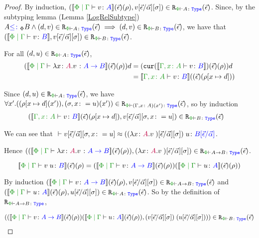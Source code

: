 \begin{framed}
\begin{proof}
            By induction, $\inLogRelPE{\deno{\gpetyperelation{v}{A}}\fundRho}{v\fundSub}{A}$.
            Since, by the subtyping lemma (Lemma \ref{LogRelSubtype}) $A\subtypep B \wedge \inLogRelPE{d}{v}{A} \implies \inLogRelPE{d}{v}{B}$, we have that $\inLogRelPE{\deno{\gpetyperelation{v}{B}}}{v\fundSub}{B}$.
        
            \case{\vfun}
        
            For all $\inLogRelPE{d}{u}{A}$, 
            \begin{align*}
                (\deno{\gpetyperelation{\lam{x}{A}{v}}{\ab}}\fundRho) d & = (\cur{\deno{\typerelation{\gax}{v}{B}}}\fundRho) d\\
                & = \deno{\typerelation{\gax}{v}{B}} (\fundRhoExt{[x\mapsto d]})\\
            \end{align*}
        
            Since $\inLogRelPE{d}{u}{A}$, we have $\forall x'. \inLogRelPE{(\rho[x\mapsto d](x'))}{(\si, x\setto u)(x')}{(\gax)(x')}$, so by induction
            \begin{align*}
                \inLogRelPE{\deno{\typerelation{\gax}{v}{B}}(\ev)(\rho[x\mapsto d])&}{v\ssub{\av}{\ev}\sub{\si, x\setto u}}{B}
            \end{align*}
        
            We can see that $\zberelation{v\ssub{\av}{\ev}{\sub{\si, x\setto u}}}{\apply{((\lam{x}{A}{v})\fundSub)}{u}}{B\ssub{\av}{\ev}}$.
        
            Hence $\inLogRelPE{(\deno{\gpetyperelation{\lam{x}{A}{v}}{\ab}}\fundRho) }{(\lam{x}{A}{v})\fundSub}{\ab}$.
        
        
        \case{\vapply}
        \begin{equation}
            \deno{\gpetyperelation{\apply{v}{u}}{B}}\fundRho = (\deno{\gpetyperelation{v}{\ab}}\fundRho)(\deno{\gpetyperelation{u}{A}}\fundRho)
        \end{equation}
        
        By induction $\inLogRelPE{\deno{\gpetyperelation{v}{\ab}}\fundRho}{v\fundSub}{\ab}$ and $\inLogRelPE{\deno{\gpetyperelation{u}{A}}\fundRho}{u\fundSub}{A}$. So by the definition of $\erelates{\P}{\ab}$, 
        
        \begin{align*}
           \inLogRelPE{(\deno{\gpetyperelation{v}{\ab}}\fundRho)(\deno{\gpetyperelation{u}{A}}\fundRho)}{\apply{(v\fundSub)}{(u\fundSub)})}{B}
        \end{align*}
        

\end{proof}
\end{framed}
